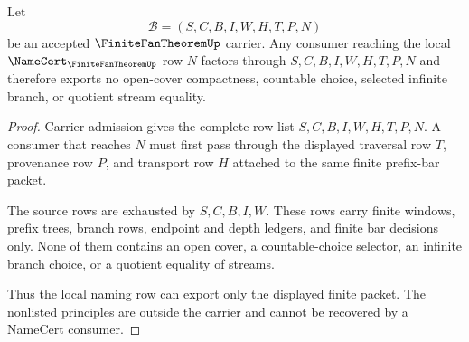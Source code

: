\begin{theorem}
\label{thm:finite-fan-theorem-nonescape}
Let
$$
\mathcal{B}=(S,C,B,I,W,H,T,P,N)
$$
be an accepted $\FiniteFanTheoremUp$ carrier. Any consumer reaching the local $\NameCert_{\FiniteFanTheoremUp}$ row $N$ factors through $S,C,B,I,W,H,T,P,N$ and therefore exports no open-cover compactness, countable choice, selected infinite branch, or quotient stream equality.
\end{theorem}
\begin{proof}
Carrier admission gives the complete row list $S,C,B,I,W,H,T,P,N$. A consumer that reaches $N$ must first pass through the displayed traversal row $T$, provenance row $P$, and transport row $H$ attached to the same finite prefix-bar packet.

The source rows are exhausted by $S,C,B,I,W$. These rows carry finite windows, prefix trees, branch rows, endpoint and depth ledgers, and finite bar decisions only. None of them contains an open cover, a countable-choice selector, an infinite branch choice, or a quotient equality of streams.

Thus the local naming row can export only the displayed finite packet. The nonlisted principles are outside the carrier and cannot be recovered by a NameCert consumer.
\end{proof}





